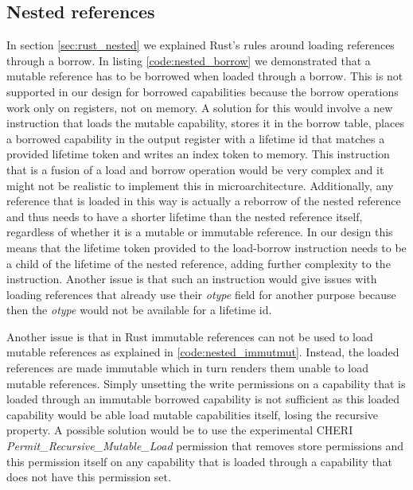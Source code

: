 \subsection{Nested references}
\label{sec:nestedrefeval}
In section \ref{sec:rust_nested} we explained Rust's rules around loading references through a borrow.
In listing \ref{code:nested_borrow} we demonstrated that a mutable reference has to be borrowed when loaded through a borrow.
This is not supported in our design for borrowed capabilities because the borrow operations work only on registers, not on memory.
A solution for this would involve a new instruction that loads the mutable capability, stores it in the borrow table, places a borrowed capability in the output register with a lifetime id that matches a provided lifetime token and writes an index token to memory.
This instruction that is a fusion of a load and borrow operation would be very complex and it might not be realistic to implement this in microarchitecture.
Additionally, any reference that is loaded in this way is actually a reborrow of the nested reference and thus needs to have a shorter lifetime than the nested reference itself, regardless of whether it is a mutable or immutable reference.
In our design this means that the lifetime token provided to the load-borrow instruction needs to be a child of the lifetime of the nested reference, adding further complexity to the instruction.
Another issue is that such an instruction would give issues with loading references that already use their \textit{otype} field for another purpose because then the \textit{otype} would not be available for a lifetime id.

Another issue is that in Rust immutable references can not be used to load mutable references as explained in \ref{code:nested_immutmut}.
Instead, the loaded references are made immutable which in turn renders them unable to load mutable references.
Simply unsetting the write permissions on a capability that is loaded through an immutable borrowed capability is not sufficient as this loaded capability would be able load mutable capabilities itself, losing the recursive property.
A possible solution would be to use the experimental CHERI \textit{Permit\_Recursive\_Mutable\_Load} permission \cite{UCAM-CL-TR-951} that removes store permissions and this permission itself on any capability that is loaded through a capability that does not have this permission set.

